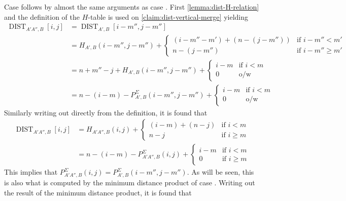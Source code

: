 \documentclass[twoside,11pt,openright]{report}
\newcommand{\DIST}{\operatorname{DIST}}
\newcommand*{\circled}[1]{\tikz[baseline=(char.base)]{
                          \node[shape=circle,draw,inner sep=2pt] (char) {#1};}}
\begin{document}
Case \circled{2} follows by almost the same arguments as case \circled{1}. First \cref{lemma:dist-H-relation} and the definition of the $H$-table is used on \cref{claim:dist-vertical-merge} yielding
\begin{align*}
  \DIST_{A'A'',B}[i, j] &= \DIST_{A',B}[i - m'', j - m''] \\
    &= H_{A',B}(i - m'', j - m'') +
      \begin{cases}
        (i - m'' - m') + (n - (j - m'')) & \text{if } i - m'' < m' \\
        n - (j - m'')                    & \text{if } i - m'' \geq m'
      \end{cases} \\
    &= n + m'' - j + H_{A',B}(i - m'', j - m'') +
      \begin{cases}
        i - m   & \text{if } i < m \\
        0       & \text{o/w}
      \end{cases} \\
    &= n - (i - m) - P_{A',B}^{\Sigma}(i - m'', j - m'') +
      \begin{cases}
        i - m   & \text{if } i < m \\
        0       & \text{o/w}
      \end{cases}
\end{align*}
Similarly writing out directly from the definition, it is found that
\begin{align*}
  \DIST_{A'A'',B}[i, j] &= H_{A'A'',B}(i, j) +
    \begin{cases}
      (i - m) + (n - j) & \text{if } i < m \\
      n - j             & \text{if } i \geq m
    \end{cases} \\
  &= n - (i - m) - P_{A'A'',B}^{\Sigma}(i, j) +
    \begin{cases}
      i - m & \text{if } i < m \\
      0     & \text{if } i \geq m
    \end{cases}
\end{align*}
This implies that $P_{A'A'',B}^{\Sigma}(i, j) = P_{A',B}^{\Sigma}(i - m'', j - m'')$. As will be seen, this is also what is computed by the minimum distance product of case \circled{3}. Writing out the result of the minimum distance product, it is found that
\end{document}
